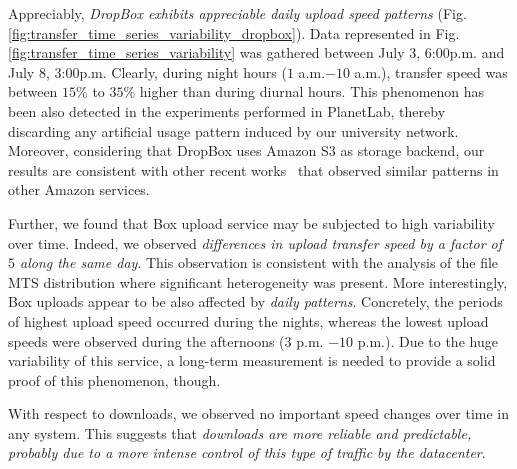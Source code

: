 Appreciably, \textit{DropBox exhibits appreciable 
daily upload speed patterns} (Fig. \ref{fig:transfer_time_series_variability_dropbox}). 
Data represented in Fig. \ref{fig:transfer_time_series_variability} was gathered between
July $3$, $6$:$00$p.m. and July $8$, $3$:$00$p.m. Clearly, during 
night hours ($1$ a.m.$-10$ a.m.), transfer speed was between $15\%$ to
$35\%$ higher than during diurnal hours. This phenomenon has been also
detected in the experiments performed in PlanetLab, thereby discarding
any artificial usage pattern induced by our university network. Moreover, considering
that DropBox uses Amazon S3 as storage backend, our results are consistent with
other recent works~\cite{variability_ccgrid11} that observed 
similar patterns in other Amazon services.

Further, we found that Box upload service may be subjected to
high variability over time. Indeed, we observed \textit{differences in
upload transfer speed by a factor of $5$  along the same day}. This observation is consistent 
with the analysis of the file MTS distribution where significant
heterogeneity was present. More interestingly, Box uploads 
appear to be also affected by \textit{daily patterns}. Concretely, 
the periods of highest upload speed occurred during
the nights, whereas the lowest upload speeds were observed during the
afternoons ($3$ p.m. $-10$ p.m.). Due to the huge variability
of this service, a long-term measurement is needed to provide
a solid proof of this phenomenon, though.


With respect to downloads, we observed no important
speed changes over time in any system. This suggests that
\textit{downloads are more reliable and predictable, probably
due to a more intense control of this type of traffic by
the datacenter}.